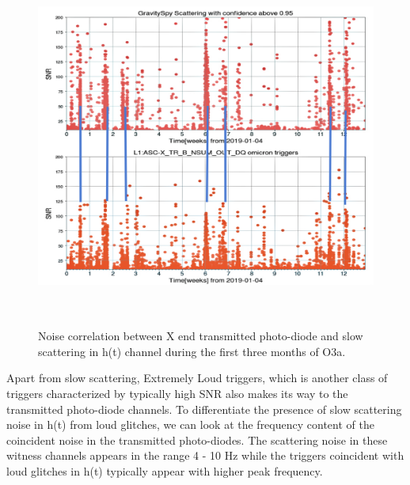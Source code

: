 \documentclass[12pt]{iopart}
\begin{document}
\begin{figure}[h]
  \centering
         \includegraphics[width = 14cm,height=12cm]{hxtrb_corr1.jpg}
         \caption{Noise correlation between X end transmitted photo-diode and slow scattering in h(t) channel during the first three months of O3a.}
    \label{fig:transetmx}
\end{figure}

Apart from slow scattering, Extremely Loud triggers, which is another class of triggers characterized by typically high SNR also makes its way to the transmitted photo-diode channels. To differentiate the presence of slow scattering noise in h(t) from loud glitches, we can look at the frequency content of the coincident noise in the transmitted photo-diodes. The scattering noise in these witness channels appears in the range  4 - 10 Hz while the triggers coincident with loud glitches in h(t) typically appear with higher peak frequency. 
\end{document}

